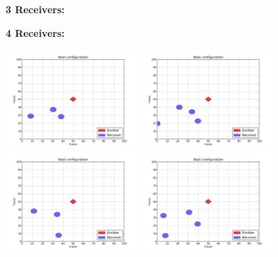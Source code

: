 \documentclass[10pt,a4paper]{book}
\begin{document}
\begin{figure}[H]
\centering
\begin{minipage}{50mm}
\textbf{3 Receivers:}
\end{minipage}%
\begin{minipage}{50mm}
\textbf{4 Receivers:}
\end{minipage}
\begin{minipage}{50mm}
  \centering
  \includegraphics[width=50mm]{Problem2NoRotateRecv3_1.jpg}
\end{minipage}%
\begin{minipage}{50mm}
  \centering
  \includegraphics[width=50mm]{Problem2NoRotateRecv4_1.jpg}
\end{minipage}
\begin{minipage}{50mm}
  \centering
  \includegraphics[width=50mm]{Problem2NoRotateRecv3_2.jpg}
\end{minipage}
\begin{minipage}{50mm}
  \centering
  \includegraphics[width=50mm]{Problem2NoRotateRecv4_2.jpg}

\end{minipage}
\end{figure}
\end{document}
